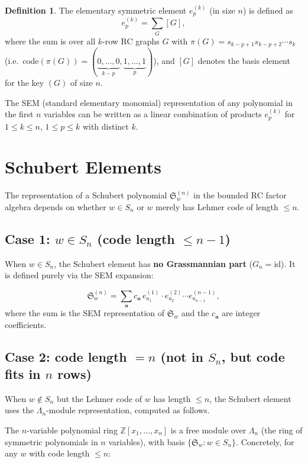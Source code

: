 \documentclass[11pt]{article}
\newcommand{\Z}{\mathbb{Z}}
\newcommand{\Sym}{S}
\newcommand{\id}{\mathrm{id}}
\newcommand{\code}{\mathrm{code}}
\newcommand{\Sch}{\mathfrak{S}}
\theoremstyle{definition}
\newtheorem{definition}{Definition}
\begin{document}
\begin{definition}
The elementary symmetric element $e_p^{(k)}$ (in size $n$) is defined as
\[
  e_p^{(k)} = \sum_{G} [G],
\]
where the sum is over all $k$-row RC graphs $G$ with $\pi(G) = s_{k-p+1} s_{k-p+2} \cdots s_k$ (i.e.\ $\code(\pi(G)) = (\underbrace{0,\ldots,0}_{k-p},\underbrace{1,\ldots,1}_{p})$), and $[G]$ denotes the basis element for the key $(G)$ of size $n$.
\end{definition}

The SEM (standard elementary monomial) representation of any polynomial in the first $n$ variables can be written as a linear combination of products $e_p^{(k)}$ for $1 \leq k \leq n$, $1 \leq p \leq k$ with distinct $k$.

\section{Schubert Elements}

The representation of a Schubert polynomial $\Sch_w^{(n)}$ in the bounded RC factor algebra depends on whether $w \in \Sym_n$ or $w$ merely has Lehmer code of length $\leq n$.

\subsection{Case 1: $w \in \Sym_n$ (code length $\leq n-1$)}

When $w \in \Sym_n$, the Schubert element has \textbf{no Grassmannian part} ($G_n = \id$).  It is defined purely via the SEM expansion:

\[
  \Sch_w^{(n)} = \sum_{\mathbf{a}} c_{\mathbf{a}} \, e_{a_1}^{(1)} \cdot e_{a_2}^{(2)} \cdots e_{a_{n-1}}^{(n-1)},
\]
where the sum is the SEM representation of $\Sch_w$ and the $c_{\mathbf{a}}$ are integer coefficients.

\subsection[Case 2: code length = n]{Case 2: code length $= n$ (not in $\Sym_n$, but code fits in $n$ rows)}

When $w \notin \Sym_n$ but the Lehmer code of $w$ has length $\leq n$, the Schubert element uses the $\Lambda_n$-module representation, computed as follows.

The  $n$-variable polynomial ring $\Z[x_1, \ldots, x_n]$ is a free module over $\Lambda_n$ (the ring of symmetric polynomials in $n$ variables), with basis $\{\Sch_w : w \in \Sym_n\}$.  Concretely, for any $w$ with code length $\leq n$:
\end{document}
